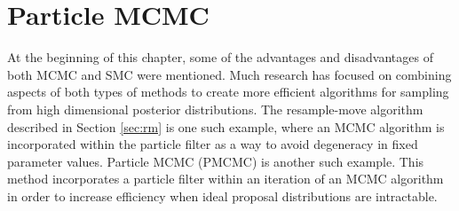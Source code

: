 \section{Particle MCMC \label{sec:pmcmc}}

At the beginning of this chapter, some of the advantages and disadvantages of both MCMC and SMC were mentioned. Much research has focused on combining aspects of both types of methods to create more efficient algorithms for sampling from high dimensional posterior distributions. The resample-move algorithm described in Section \ref{sec:rm} is one such example, where an MCMC algorithm is incorporated within the particle filter as a way to avoid degeneracy in fixed parameter values. Particle MCMC (PMCMC) \citep{Andr:Douc:Hol:pmcmc:2010} is another such example. This method incorporates a particle filter within an iteration of an MCMC algorithm in order to increase efficiency when ideal proposal distributions are intractable.

